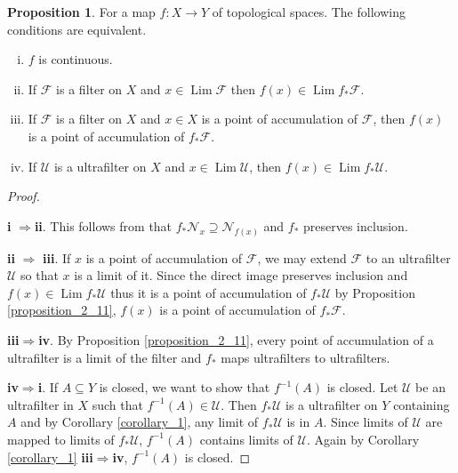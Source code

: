 \documentclass[10pt]{article}
\numberwithin{equation}{section}
\theoremstyle{definition}
\newtheorem{proposition}{Proposition}[subsection]
\DeclareMathOperator{\Lim}{Lim}
\newcommand{\F}[0]{\mathcal{F}}
\newcommand{\U}[0]{\mathcal{U}}
\newcommand{\cF}[0]{\mathcal{F}}
\begin{document}
\begin{proposition}
    \label{fact_12}
    For a map $f:X\to Y$ of topological spaces. The following conditions are equivalent.
    \begin{enumerate}[i.]
        \item $f$ is continuous.
        \item If $\F$ is a filter on $X$ and $x\in\Lim\mathcal{F}$ then $f(x)\in\Lim f_*\F$.
        \item If $\F$ is a filter on $X$ and $x\in X$ is a point of accumulation of $\F$, then $f(x)$ is a point of accumulation of $f_*\F$.
        \item If $\mathcal{U}$ is a ultrafilter on $X$ and $x\in\Lim\mathcal{U}$, then $f(x)\in\Lim f_*\mathcal{U}$.
    \end{enumerate}
\end{proposition}
\begin{proof}$\:$
    \par\textbf{i} $\Rightarrow $\textbf{ii}. This follows from that $f_*\mathcal{N}_x\supseteq\mathcal{N}_{f(x)}$ and $f_*$ preserves inclusion.
    \par\textbf{ii} $\Rightarrow$ \textbf{iii}. If $x$ is a point of accumulation of $\cF$, we may extend $\cF$ to an ultrafilter $\mathcal{U}$ so that $x$ is a limit of it. Since the direct image preserves inclusion and $f(x)\in\Lim f_*\mathcal{U}$ thus it is a point of accumulation of $f_*\mathcal{U}$ by Proposition \ref{proposition_2_11}, $f(x)$ is a point of accumulation of $f_*\cF$. %
    \par\textbf{iii}$\Rightarrow$\textbf{iv}. By Proposition \ref{proposition_2_11}, every point of accumulation of a ultrafilter is a limit of the filter and $f_*$ maps ultrafilters to ultrafilters.
    \par\textbf{iv}$\Rightarrow$\textbf{i}. If $A\subseteq Y$ is closed, we want to show that $f^{-1}(A)$ is closed. Let $\U$ be an ultrafilter in $X$ such that $f^{-1}(A)\in\U$. Then $f_*\U$ is a ultrafilter on $Y$ containing $A$ and by Corollary \ref{corollary_1}, any limit of $f_*\U$ is in $A$. Since limits of $\U$ are mapped to limits of $f_*\U$, $f^{-1}(A)$ contains limits of $\U$. Again by Corollary \ref{corollary_1} \textbf{iii}$\Rightarrow$\textbf{iv}, $f^{-1}(A)$ is closed.
\end{proof}
\end{document}
